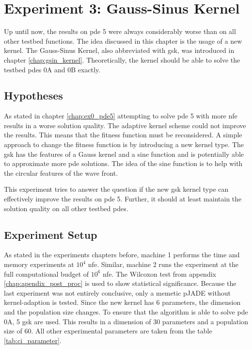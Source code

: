\documentclass[./\jobname.tex]{subfiles}
\begin{document}
\section {Experiment 3: Gauss-Sinus Kernel}
\label{chap:experimet_3}

Up until now, the results on \gls{pde} 5 were always considerably worse than on all other testbed functions. The idea discussed in this chapter is the usage of a new kernel. The Gauss-Sinus Kernel, also abbreviated with \gls{gsk}, was introduced in chapter \ref{chap:gsin_kernel}. Theoretically, the kernel should be able to solve the testbed \gls{pde}s 0A and 0B exactly.  

\subsection{Hypotheses}
As stated in chapter \ref{chap:ex0_pde5} attempting to solve \gls{pde} 5 with more \gls{nfe} results in a worse solution quality. The adaptive kernel scheme could not improve the results. This means that the fitness function must be reconsidered. A simple approach to change the fitness function is by introducing a new kernel type. The \gls{gsk} has the features of a Gauss kernel and a sine function and is potentially able to approximate more \gls{pde} solutions. The idea of the sine function is to help with the circular features of the wave front. 

This experiment tries to answer the question if the new \gls{gsk} kernel type can effectively improve the results on \gls{pde} 5. Further, it should at least maintain the solution quality on all other testbed \gls{pde}s. 

\subsection{Experiment Setup}

As stated in the experiments chapters before, machine 1 performs the time and memory experiments at $10^4$ \gls{nfe}. Similar, machine 2 runs the experiment at the full computational budget of $10^6$ \gls{nfe}. The Wilcoxon test from appendix \ref{chap:apendix_post_proc} is used to show statistical significance. Because the last experiment was not entirely conclusive, only a memetic pJADE without kernel-adaption is tested. Since the new kernel has 6 parameters, the dimension and the population size changes. To ensure that the algorithm is able to solve \gls{pde} 0A, 5 \gls{gsk} are used. This results in a dimension of 30 parameters and a population size of 60. All other experimental parameters are taken from the table \ref{tab:ci_parameter}. 
\end{document}
